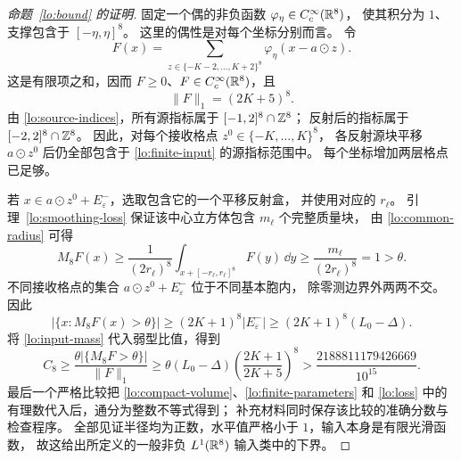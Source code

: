 \begin{proof}[命题~\ref{lo:bound} 的证明]
固定一个偶的非负函数 $\varphi_\eta\in C_c^\infty(\mathbb{R}^8)$，
使其积分为 $1$、支撑包含于 $[-\eta,\eta]^8$。
这里的偶性是对每个坐标分别而言。
令
\begin{equation}\label{lo:finite-input}
 F(x)=\sum_{z\in\{-K-2,\ldots,K+2\}^8}
       \varphi_\eta(x-a\odot z).
\end{equation}
这是有限项之和，因而 $F\ge0$、$F\in C_c^\infty(\mathbb{R}^8)$，且
\begin{equation}\label{lo:input-mass}
 \|F\|_1=(2K+5)^8.
\end{equation}
由 \eqref{lo:source-indices}，所有源指标属于 $[-1,2]^8\cap\mathbb{Z}^8$；
反射后的指标属于 $[-2,2]^8\cap\mathbb{Z}^8$。
因此，对每个接收格点 $z^0\in\{-K,\ldots,K\}^8$，
各反射源块平移 $a\odot z^0$ 后仍全部包含于 \eqref{lo:finite-input} 的源指标范围中。
每个坐标增加两层格点已足够。

若 $x\in a\odot z^0+E_\varepsilon^-$，选取包含它的一个平移反射盒，
并使用对应的 $r_\ell$。
引理~\ref{lo:smoothing-loss} 保证该中心立方体包含 $m_\ell$ 个完整质量块，
由 \eqref{lo:common-radius} 可得
\[
 M_8F(x)\ge
 \frac{1}{(2r_\ell)^8}
 \int_{x+[-r_\ell,r_\ell]^8}F(y)\,\dd y
 \ge\frac{m_\ell}{(2r_\ell)^8}=1>\theta.
\]
不同接收格点的集合 $a\odot z^0+E_\varepsilon^-$ 位于不同基本胞内，
除零测边界外两两不交。因此
\[
 |\{x:M_8F(x)>\theta\}|
 \ge(2K+1)^8|E_\varepsilon^-|
 \ge(2K+1)^8(L_0-\Delta).
\]
将 \eqref{lo:input-mass} 代入弱型比值，得到
\begin{equation}\label{lo:finite-ratio}
 C_8\ge
 \frac{\theta|\{M_8F>\theta\}|}{\|F\|_1}
 \ge\theta(L_0-\Delta)
       \left(\frac{2K+1}{2K+5}\right)^8
 >\frac{2188811179426669}{10^{15}}.
\end{equation}
最后一个严格比较把 \eqref{lo:compact-volume}、\eqref{lo:finite-parameters}
和 \eqref{lo:loss} 中的有理数代入后，通分为整数不等式得到；
补充材料同时保存该比较的准确分数与检查程序。
全部见证半径均为正数，水平值严格小于 $1$，输入本身是有限光滑函数，
故这给出所定义的一般非负 $L^1(\mathbb{R}^8)$ 输入类中的下界。
\end{proof}
